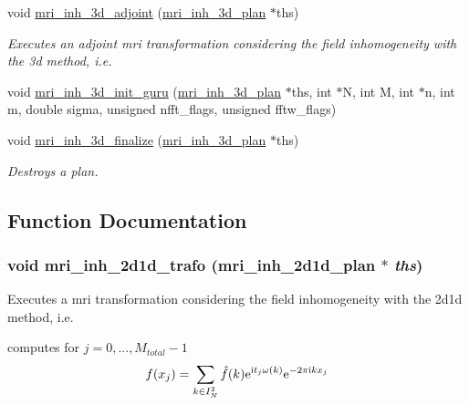 \begin{CompactItemize}
void \hyperlink{group__mri_gc385874f7e751acd9120537ac58069b8}{mri\_\-inh\_\-3d\_\-adjoint} (\hyperlink{structmri__inh__3d__plan}{mri\_\-inh\_\-3d\_\-plan} $\ast$ths)
\begin{CompactList}\small\item\em Executes an adjoint mri transformation considering the field inhomogeneity with the 3d method, i.e. \item\end{CompactList}\item 
\hypertarget{group__mri_gdaab02ce08e45dab866fd5f841700afb}{
void \hyperlink{group__mri_gdaab02ce08e45dab866fd5f841700afb}{mri\_\-inh\_\-3d\_\-init\_\-guru} (\hyperlink{structmri__inh__3d__plan}{mri\_\-inh\_\-3d\_\-plan} $\ast$ths, int $\ast$N, int M, int $\ast$n, int m, double sigma, unsigned nfft\_\-flags, unsigned fftw\_\-flags)}
\label{group__mri_gdaab02ce08e45dab866fd5f841700afb}

\item 
void \hyperlink{group__mri_gdcf8b78420d90797f43abb15be1d9cf5}{mri\_\-inh\_\-3d\_\-finalize} (\hyperlink{structmri__inh__3d__plan}{mri\_\-inh\_\-3d\_\-plan} $\ast$ths)
\begin{CompactList}\small\item\em Destroys a plan. \item\end{CompactList}\end{CompactItemize}


\subsection{Function Documentation}
\hypertarget{group__mri_g0dad1c9466615a5791b5037ab2f85373}{
\subsubsection{\setlength{\rightskip}{0pt plus 5cm}void mri\_\-inh\_\-2d1d\_\-trafo ({\bf mri\_\-inh\_\-2d1d\_\-plan} $\ast$ {\em ths})}}
\label{group__mri_g0dad1c9466615a5791b5037ab2f85373}


Executes a mri transformation considering the field inhomogeneity with the 2d1d method, i.e. 

computes for $j=0,...,M_{total}-1$ \[ f(x_j) = \sum_{k \in I_N^2} \hat{f}(k) {\rm e}^{\mbox{\rm\scriptsize i} t_j \omega(k)} {\rm e}^{-2 \pi \mbox{\rm\scriptsize i} k x_j} \]

